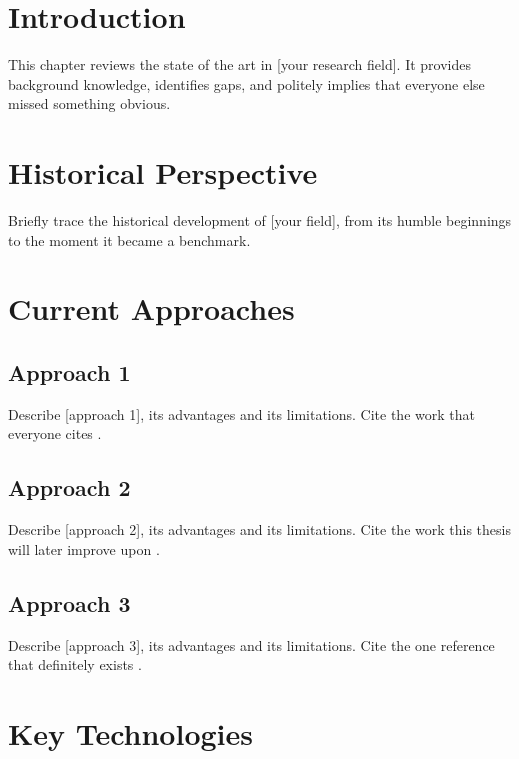 
\section{Introduction}

This chapter reviews the state of the art in [your research field]. It
provides background knowledge, identifies gaps, and politely implies
that everyone else missed something obvious.

\section{Historical Perspective}

Briefly trace the historical development of [your field], from its
humble beginnings to the moment it became a benchmark.

\section{Current Approaches}

\subsection{Approach 1}

Describe [approach 1], its advantages and its limitations. Cite the
work that everyone cites \cite{davis2017chapter}.

\subsection{Approach 2}

Describe [approach 2], its advantages and its limitations. Cite the
work this thesis will later improve upon \cite{brown2018book}.

\subsection{Approach 3}

Describe [approach 3], its advantages and its limitations. Cite the one
reference that definitely exists \cite{miller2016thesis}.

\section{Key Technologies}

